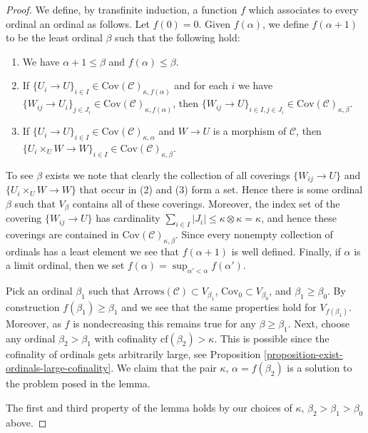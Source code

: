 \begin{proof}
\medskip\noindent
We define, by transfinite induction, a function $f$ which associates
to every ordinal an ordinal as follows. Let $f(0) = 0$.
Given $f(\alpha)$, we define $f(\alpha + 1)$ to be the least
ordinal $\beta$ such that the following hold:
\begin{enumerate}
\item We have $\alpha + 1 \leq \beta$ and $f(\alpha) \leq \beta$.
\item If $\{U_i \to U\}_{i\in I}
\in \text{Cov}(\mathcal{C})_{\kappa, f(\alpha)}$
and for each $i$ we have
$\{W_{ij} \to U_i\}_{j\in J_i}
\in \text{Cov}(\mathcal{C})_{\kappa, f(\alpha)}$,
then
$\{W_{ij} \to U\}_{i \in I, j\in J_i}
\in \text{Cov}(\mathcal{C})_{\kappa, \beta}$.
\item If $\{U_i \to U\}_{i\in I}
\in \text{Cov}(\mathcal{C})_{\kappa, \alpha}$
and $W \to U$ is a morphism of $\mathcal{C}$, then
$\{U_i \times_U W \to W \}_{i\in I}
\in \text{Cov}(\mathcal{C})_{\kappa, \beta}$.
\end{enumerate}
To see $\beta$ exists we note that clearly the collection of all
coverings $\{W_{ij} \to U\}$ and $\{U_i \times_U W \to W \}$ that occur in
(2) and (3) form a set. Hence there is some ordinal $\beta$ such that
$V_\beta$ contains all of these coverings. Moreover, the index set
of the covering $\{W_{ij} \to U\}$ has cardinality
$\sum_{i \in I} |J_i| \leq \kappa \otimes \kappa = \kappa$, and
hence these coverings are contained in
$\text{Cov}(\mathcal{C})_{\kappa, \beta}$.
Since every nonempty collection of ordinals has a least element
we see that $f(\alpha + 1)$ is well defined. Finally, if $\alpha$
is a limit ordinal, then we set
$f(\alpha) = \sup_{\alpha' < \alpha} f(\alpha')$.

\medskip\noindent
Pick an ordinal $\beta_1$ such that
$\text{Arrows}(\mathcal{C}) \subset V_{\beta_1}$,
$\text{Cov}_0 \subset V_{\beta_0}$,
and $\beta_1 \geq \beta_0$.
By construction $f(\beta_1) \geq \beta_1$ and we see that
the same properties hold for $V_{f(\beta_1)}$. Moreover, as $f$ is
nondecreasing this remains true for any $\beta \geq \beta_1$.
Next, choose any ordinal $\beta_2 > \beta_1$ with
cofinality $\text{cf}(\beta_2) > \kappa$. This is possible
since the cofinality of ordinals gets arbitrarily large, see
Proposition \ref{proposition-exist-ordinals-large-cofinality}.
We claim that the pair $\kappa$,
$\alpha = f(\beta_2)$ is a solution to the problem posed in the lemma.

\medskip\noindent
The first and third property of the lemma holds by our choices
of $\kappa$, $\beta_2 > \beta_1 > \beta_0$ above.


\end{proof}
